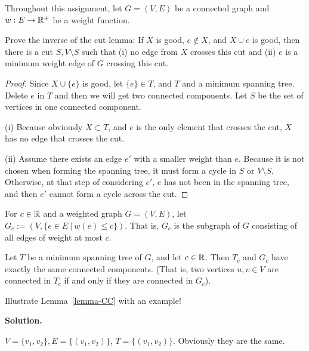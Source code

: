 


Throughout this assignment, let $G = (V,E)$ be a connected graph
and $w: E \rightarrow \mathbb{R}^+$ be a weight function.\\

\begin{exercise}
    Prove the inverse of the cut lemma:
      If $X$ is good, $e \not \in X$, and $X \cup e$ is good,
      then there is a cut $S, V\setminus S$ such that (i) no
      edge from $X$ crosses this cut and (ii) $e$ is a minimum
      weight edge of $G$ crossing this cut.
\end{exercise}
\begin{proof}
    Since $X \cup \{e\}$ is good, let $\{e\}\in T$, and $T$ and a minimum spanning tree. Delete $e$ in $T$ and then we will get two connected components. Let $S$ be the set of vertices in one connected component.

    (i) Because obviously $X\subset T$, and $e$ is the only element that crosses the cut, $X$ has no edge that crosses the cut.

    (ii) Assume there exists an edge $e'$ with a smaller weight than $e$. Because it is not chosen when forming the spanning tree, it must form a cycle in $S$ or $V\setminus S$. Otherwise, at that step of considering $e'$, $e$ has not been in the spanning tree, and then $e'$ cannot form a cycle across the cut.
\end{proof}

\begin{definition}
  For $c \in \mathbb{R}$ and a weighted graph $G = (V,E)$, let
  $G_c := (V, \{e \in E \ | \ w(e) \leq c\})$. That is, $G_c$ is the
  subgraph of $G$ consisting of all edges of weight at most $c$.
\end{definition}

\begin{lemma}
  Let $T$ be a minimum spanning tree of $G$, and let $c \in \mathbb{R}$.  Then
  $T_c$ and $G_c$ have exactly the same connected components.  (That
  is, two vertices $u,v \in V$ are connected in $T_c$ if and only if
  they are connected in $G_c$).
  \label{lemma-CC}
\end{lemma}

\begin{exercise}
     Illustrate Lemma~\ref{lemma-CC} with an example!
\end{exercise}

\textbf{Solution.}
\par 
$V=\{v_1,v_2\},E=\{(v_1,v_2)\}$, $T=\{(v_1,v_2)\}$. Obviously they are the same.

